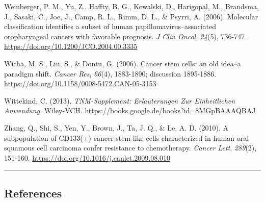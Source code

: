 Weinberger, P. M., Yu, Z., Haffty, B. G., Kowalski, D., Harigopal, M., Brandsma, J., Sasaki, C., Joe, J., Camp, R. L., Rimm, D. L., \& Psyrri, A. (2006). Molecular classification identifies a subset of human papillomavirus--associated oropharyngeal cancers with favorable prognosis. \emph{J Clin Oncol}, \emph{24}(5), 736-747. \url{https://doi.org/10.1200/JCO.2004.00.3335}

Wicha, M. S., Liu, S., \& Dontu, G. (2006). Cancer stem cells: an old idea--a paradigm shift. \emph{Cancer Res}, \emph{66}(4), 1883-1890; discussion 1895-1886. \url{https://doi.org/10.1158/0008-5472.CAN-05-3153}

Wittekind, C. (2013). \emph{TNM-Supplement: Erlauterungen Zur Einheitlichen Anwendung}. Wiley-VCH. \url{https://books.google.de/books?id=8MGpBAAAQBAJ}

Zhang, Q., Shi, S., Yen, Y., Brown, J., Ta, J. Q., \& Le, A. D. (2010). A subpopulation of CD133(+) cancer stem-like cells characterized in human oral squamous cell carcinoma confer resistance to chemotherapy. \emph{Cancer Lett}, \emph{289}(2), 151-160. \url{https://doi.org/10.1016/j.canlet.2009.08.010}

\begin{center}\rule{0.5\linewidth}{0.5pt}\end{center}

\hypertarget{references}{%
\subsection{References}\label{references}}

